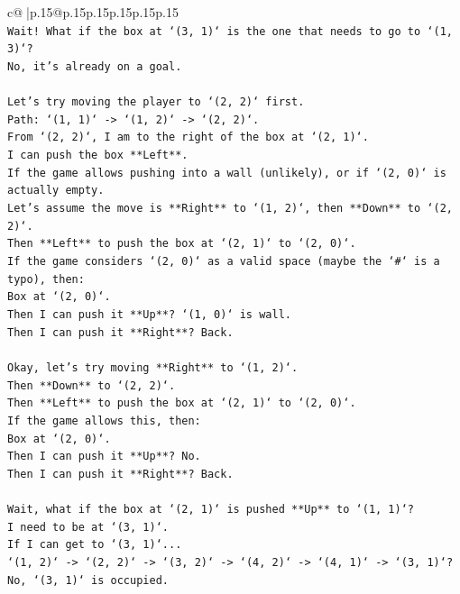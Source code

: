 \documentclass{article}
\begin{document}
{\begin{supertabular}{c@{$\;$}|p{.15\linewidth}@{}p{.15\linewidth}p{.15\linewidth}p{.15\linewidth}p{.15\linewidth}p{.15\linewidth}}
{{{\\ 
\texttt{Wait! What if the box at `(3, 1)` is the one that needs to go to `(1, 3)`?} \\
\texttt{No, it's already on a goal.} \\
\\ 
\texttt{Let's try moving the player to `(2, 2)` first.} \\
\texttt{Path: `(1, 1)` {-}> `(1, 2)` {-}> `(2, 2)`.} \\
\texttt{From `(2, 2)`, I am to the right of the box at `(2, 1)`.} \\
\texttt{I can push the box **Left**.} \\
\texttt{If the game allows pushing into a wall (unlikely), or if `(2, 0)` is actually empty.} \\
\texttt{Let's assume the move is **Right** to `(1, 2)`, then **Down** to `(2, 2)`.} \\
\texttt{Then **Left** to push the box at `(2, 1)` to `(2, 0)`.} \\
\texttt{If the game considers `(2, 0)` as a valid space (maybe the `\#` is a typo), then:} \\
\texttt{Box at `(2, 0)`.} \\
\texttt{Then I can push it **Up**? `(1, 0)` is wall.} \\
\texttt{Then I can push it **Right**? Back.} \\
\\ 
\texttt{Okay, let's try moving **Right** to `(1, 2)`.} \\
\texttt{Then **Down** to `(2, 2)`.} \\
\texttt{Then **Left** to push the box at `(2, 1)` to `(2, 0)`.} \\
\texttt{If the game allows this, then:} \\
\texttt{Box at `(2, 0)`.} \\
\texttt{Then I can push it **Up**? No.} \\
\texttt{Then I can push it **Right**? Back.} \\
\\ 
\texttt{Wait, what if the box at `(2, 1)` is pushed **Up** to `(1, 1)`?} \\
\texttt{I need to be at `(3, 1)`.} \\
\texttt{If I can get to `(3, 1)`...} \\
\texttt{`(1, 2)` {-}> `(2, 2)` {-}> `(3, 2)` {-}> `(4, 2)` {-}> `(4, 1)` {-}> `(3, 1)`? No, `(3, 1)` is occupied.} \\
\\ 
}}}
\end{supertabular}}
\end{document}
